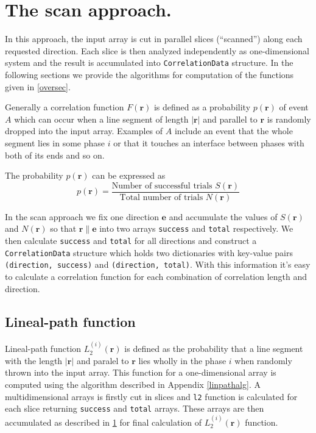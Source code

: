 \documentclass[reprint,amsmath,amssymb,aps,pre,nofootinbib]{revtex4-1}
\newcommand{\code}[1]{\colorbox{light-gray}{\texttt{#1}}}
\newcommand{\apref}[1]{Appendix \ref{#1}}
\begin{document}
\section{The scan approach.}
\label{scansec}
In this approach, the input array is cut in parallel slices (``scanned'') along
each requested direction. Each slice is then analyzed independently as
one-dimensional system and the result is accumulated into \code{CorrelationData}
structure. In the following sections we provide the algorithms for computation
of the functions given in \cref{oversec}.

Generally a correlation function $F(\bm{r})$ is defined as a probability
$p(\bm{r})$ of event $A$ which can occur when a line segment of length
$|\bm{r}|$ and parallel to $\bm{r}$ is randomly dropped into the input
array. Examples of $A$ include an event that the whole segment lies in some
phase $i$ or that it touches an interface between phases with both of its ends
and so on.

The probability $p(\bm{r})$ can be expressed as
\begin{equation*}
  p(\bm{r}) = \frac{\text{Number of successful trials $S(\bm{r})$}}
  {\text{Total number of trials $N(\bm{r})$}}
\end{equation*}

In the scan approach we fix one direction $\bm{e}$ and accumulate the values of
$S(\bm{r})$ and $N(\bm{r})$ so that $\bm{r} \parallel \bm{e}$ into two arrays
\code{success} and \code{total} respectively. We then calculate \code{success}
and \code{total} for all directions and construct a \code{CorrelationData}
structure which holds two dictionaries with key-value pairs
\code{(direction, success)} and \code{(direction, total)}. With this information
it's easy to calculate a correlation function for each combination of
correlation length and direction.

\subsection{Lineal-path function}
Lineal-path function $L_2^{(i)}(\bm{r})$ is defined as the probability that a
line segment with the length $|\bm{r}|$ and paralel to $\bm{r}$ lies wholly in
the phase $i$ when randomly thrown into the input array. This function for a
one-dimensional array is computed using the algorithm described in
\apref{linpathalg}. A multidimensional arrays is firstly cut in slices and
\code{l2} function is calculated for each slice returning \code{success} and
\code{total} arrays. These arrays are then accumulated as described in
\cref{scansec} for final calculation of $L_2^{(i)}(\bm{r})$ function.
\end{document}
